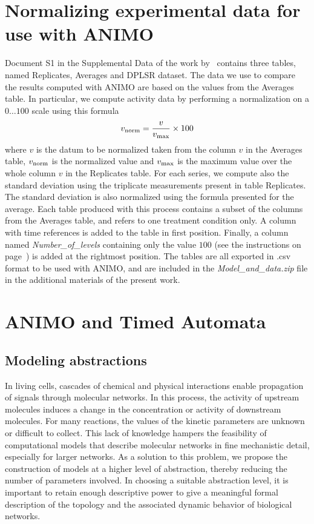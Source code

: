 \documentclass{bmcart}
\begin{document}
\section*{Normalizing experimental data for use with ANIMO}\label{suppl-sec:normalization}
Document S1 in the Supplemental Data of the work by~\cite{pathway-autocrine} contains
three tables, named {\sf Replicates}, {\sf Averages} and {\sf DPLSR dataset}.
The data we use to compare the results computed with ANIMO are based on the
values from the {\sf Averages} table.
In particular, we compute activity data by performing a normalization on a $0\dots 100$ scale using this formula
$$
v_{\mbox{\scriptsize norm}} = \frac{v}{v_{\mbox{\scriptsize max}}} \times 100
$$
where $v$ is the datum to be normalized taken from the column $v$ in the {\sf Averages} table,
$v_{\mbox{\scriptsize norm}}$ is the normalized value and
$v_{\mbox{\scriptsize max}}$ is the maximum value over the whole column $v$ in the {\sf Replicates} table.
For each series, we compute also the standard deviation using the triplicate measurements
present in table {\sf Replicates}. The standard deviation is also normalized using the formula presented for the average.
Each table produced with this process contains a subset of the columns from the {\sf Averages} table,
and refers to one treatment condition only. A column with time references is added to the table in first position.
Finally, a column named \emph{Number\_of\_levels} containing only the value $100$ (see the instructions
on page~\pageref{csv-import-format}) is added at the rightmost position.
The tables are all exported in .csv format to be used with ANIMO, and are included in the \emph{Model\_and\_data.zip}
file in the additional materials of the present work.


\clearpage
\section*{ANIMO and Timed Automata}\label{suppl-sec:animo-ta}
\subsection*{Modeling abstractions}\label{subsec:abstractions}

In living cells, cascades of chemical and physical interactions enable propagation of signals through molecular networks.
In this process, the activity of upstream molecules induces a change in the 
concentration or activity of downstream molecules. For many reactions, the values of the kinetic parameters 
are unknown or difficult to collect. This lack of knowledge hampers the feasibility 
of computational models that describe molecular networks in fine mechanistic detail, especially for larger networks.
As a solution to this problem, we propose the construction of models at a higher level of abstraction, 
thereby reducing the number of parameters involved. In choosing a suitable abstraction level, it is important to 
retain enough descriptive power to give a meaningful formal description of the topology and the 
associated dynamic behavior of biological networks.
\end{document}
